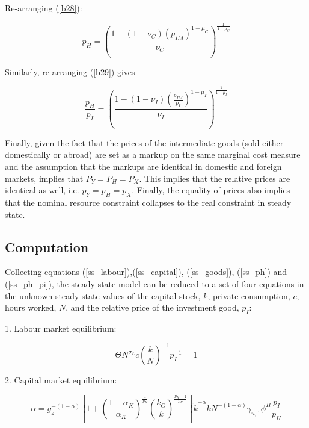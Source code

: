 \documentclass[a4paper,11pt]{article}
\numberwithin{equation}{section}
\begin{document}
	Re-arranging (\ref{b28}):
	
	\begin{equation} \label{ss_ph}
	p_H=\left(\frac{1-\left(1-\nu_C\right)\left(p_{IM}\right)^{1-\mu_C}}{\nu_C}\right)^{\frac{1}{1-\mu_C}}
	\end{equation}
	
    Similarly, re-arranging (\ref{b29}) gives
	
	\begin{equation} \label{ss_ph_pi}
	\frac{p_H}{p_I}=\left(\frac{1-\left(1-\nu_I\right)\left(\frac{p_{IM}}{p_I}\right)^{1-\mu_I}}{\nu_I}\right)^{\frac{1}{1-\mu_I}}
	\end{equation}
	
	Finally, given the fact that the prices of the intermediate goods (sold either domestically or abroad) are set as a markup on the same marginal cost measure and the assumption that the markups are identical in domestic and foreign markets, implies that $P_Y=P_H=P_X$. This implies that the relative prices are identical as well, i.e. $p_Y=p_H=p_X$. Finally, the equality of prices also implies that the nominal resource constraint collapses to the real constraint in steady state.
	
	\subsection{Computation}
	
	Collecting equations (\ref{ss_labour}),(\ref{ss_capital}), (\ref{ss_goods}), (\ref{ss_ph}) and (\ref{ss_ph_pi}), the steady-state model can be reduced to a set of four equations in the unknown steady-state values of the capital stock, $k$, private consumption, $c$, hours worked, $N$, and the relative price of the investment good, $p_I$:
	
	1. Labour market equilibrium:
	
	\begin{equation}
	\Theta N^{\sigma_L}c\left(\frac{k}{N}\right)^{-1}p_I^{-1}=1
	\end{equation}
	
	2. Capital market equilibrium:
	
	\begin{equation} 	\alpha=g_z^{-(1-\alpha)}\left[1+\left(\frac{1-\alpha_K}{\alpha_K}\right)^{\frac{1}{\nu_K}}\left(\frac{k_G}{k}\right)^{\frac{\nu_K-1}{\nu_K}}\right]\tilde{k}^{-\alpha}kN^{-(1-\alpha)}\gamma_{u,1}\phi^H\frac{p_I}{p_H}
	\end{equation}
	
\end{document}
